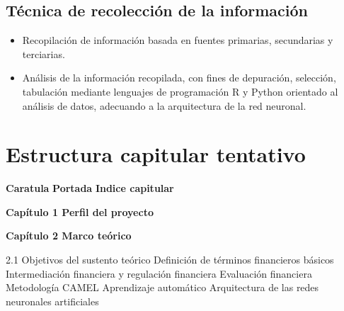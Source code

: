 \documentclass[
  12pt,
]{article}
\providecommand{\tightlist}{%
  \setlength{\itemsep}{0pt}\setlength{\parskip}{0pt}}
\begin{document}
\hypertarget{tuxe9cnica-de-recolecciuxf3n-de-la-informaciuxf3n}{%
\subsection{Técnica de recolección de la
información}\label{tuxe9cnica-de-recolecciuxf3n-de-la-informaciuxf3n}}

\begin{itemize}
\tightlist
\item
  Recopilación de información basada en fuentes primarias, secundarias y
  terciarias.
\item
  Análisis de la información recopilada, con fines de depuración,
  selección, tabulación mediante lenguajes de programación R y Python
  orientado al análisis de datos, adecuando a la arquitectura de la red
  neuronal.
\end{itemize}

\newpage

\hypertarget{estructura-capitular-tentativo}{%
\section{Estructura capitular
tentativo}\label{estructura-capitular-tentativo}}

\textbf{Caratula} \newline  \textbf{Portada} \newline 
\textbf{Indice capitular}

\vspace{2.5mm}

\textbf{Capítulo 1 Perfil del proyecto} \vspace{2.5mm}

\vspace{2.5mm}

\textbf{Capítulo 2 Marco teórico} \vspace{2.5mm}

2.1 Objetivos del sustento teórico  Definición de términos
financieros básicos  Intermediación financiera y regulación
financiera  Evaluación financiera  Metodología
CAMEL  Aprendizaje automático  Arquitectura de
las redes neuronales artificiales

\vspace{2.5mm}
\end{document}
